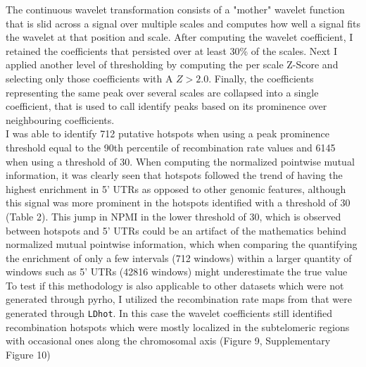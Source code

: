 \documentclass[12pt,a4paper]{article}
\begin{document}
The continuous wavelet transformation consists of a "mother" wavelet function that is slid
across a signal over multiple scales and computes how well a signal fits the wavelet at that
position and scale. After computing the wavelet coefficient, I retained  the coefficients that persisted over at least 30\% of the scales.
Next I applied another level of thresholding by computing the per scale Z-Score and selecting only those coefficients with A $Z >
	2.0$. Finally, the coefficients representing the same peak over several scales are collapsed into a
single coefficient, that is used to call identify peaks based on its prominence over neighbouring
coefficients. \\

I was able to identify 712 putative hotspots when using a
peak prominence threshold equal to the 90th percentile of recombination rate values and 6145 when
using a threshold of 30. When computing the normalized pointwise mutual information, it was clearly
seen that hotspots followed the trend of having the highest enrichment in 5' UTRs as opposed to
other genomic features, although this signal was more prominent in the hotspots identified with a
threshold of 30 (Table 2). This jump in NPMI in the lower threshold of 30, which is observed between
hotspots and 5' UTRs could be an artifact of the mathematics behind normalized mutual pointwise
information, which when comparing the quantifying the enrichment of only a few intervals (712 windows) within a
larger quantity of windows such as 5' UTRs (42816 windows) might underestimate the true value\\

To test if this methodology is also applicable to other datasets which were not generated through
pyrho, I utilized the recombination rate maps from \cite{singhal_2015} that were generated through
\texttt{LDhot}. In this case the wavelet coefficients still identified recombination hotspots which
were mostly localized in the subtelomeric regions with occasional ones along the chromosomal axis
(Figure 9, Supplementary Figure 10)
\end{document}
